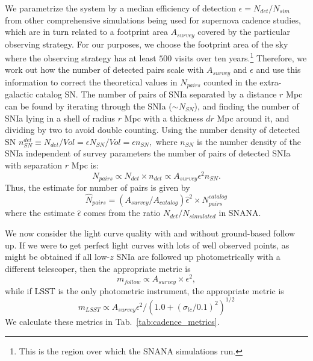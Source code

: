 \documentclass[a4paper,10pt]{article}
\begin{document}
We parametrize the system by a median efficiency of detection $\epsilon = N_{det}/N_{sim}$ from other comprehensive simulations being used for supernova cadence studies, which are in turn related to a footprint area $A_{survey}$ covered by the particular observing strategy. For our purposes, we choose the footprint area of the sky where the observing strategy has at least $500$ visits over ten years.\footnote{This is the region over which the SNANA simulations run.}
Therefore, we work out how the number of detected pairs scale with $A_{survey}$ and $\epsilon$ and use this information to correct the theoretical values in $N_{pairs}$ counted in the extra-galactic catalog SN. The number of pairs of SNIa separated by a distance $r$ Mpc can be found by iterating through the SNIa ($\sim N_{SN}$), and finding the number of SNIa lying in a shell of radius $r$ Mpc with a thickness $dr$ Mpc around it, and dividing by two to avoid double counting. Using the number density of detected SN $n^{det}_{SN} \equiv N_{det}/Vol = \epsilon N_{SN}/Vol = \epsilon n_{SN},$ where $n_{SN}$ is the number density of the SNIa independent of survey parameters the number of pairs of detected SNIa with separation $r$ Mpc is:
    $$
    N_{pairs} \propto N_{det} \times {n_{det}} \propto A_{survey} \epsilon^2 {n_{SN}}.
    $$
Thus, the estimate for number of pairs is given by
$$
    \hat{N}_{pairs} = \left( A_{survey} / A_{catalog} \right)\hat{\epsilon}^2 \times N_{pairs}^{catalog}
    $$
where the estimate $\hat{\epsilon}$ comes from the ratio $N_{det}/ N_{simulated}$ in SNANA. 

We now consider the light curve quality with and without ground-based follow up.
If we were to get perfect light curves with lots of well observed points, as might be obtained if all low-$z$ SNIa are followed up photometrically with a different telescoper, then the appropriate metric is 
\begin{equation}
    m_{follow} \propto A_{survey} \times \epsilon^2,
\end{equation}
while if LSST is the only photometric instrument, the appropriate metric is
\begin{equation}
    m_{LSST} \propto A_{survey} \epsilon^2 /(1.0 + \left(\sigma_{lc}/0.1\right)^2)^{1/2}
\end{equation}
We calculate these metrics in Tab.~\ref{tab:cadence_metrics}.
\end{document}
